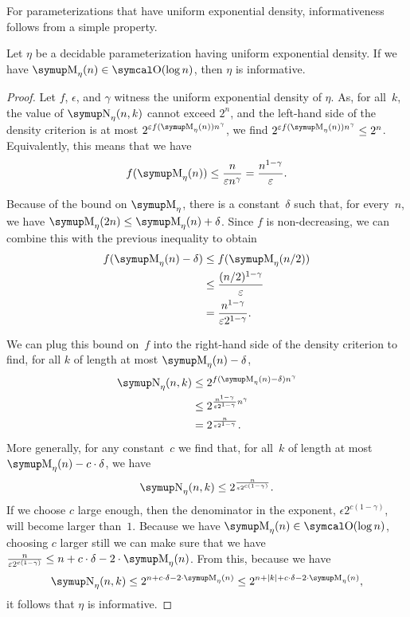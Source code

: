 For parameterizations that have uniform exponential density, informativeness follows from a simple property.
\begin{lemma}
\label{lem:exponentialinformative}%
  Let $\eta$ be a decidable parameterization having uniform exponential density.
  If we have $\upM_\eta(n) \in \bigO(\log n)$, then $\eta$ is informative.
\end{lemma}
\begin{proof}
  Let $f$, $\epsilon$, and $\gamma$ witness the uniform exponential density of $\eta$.
  As, for all~$k$, the value of $\upN_\eta(n, k)$ cannot exceed $2^n$, and the left-hand side of the density criterion is at most $2^{\epsilon f(\upM_\eta(n)) n^\gamma}$, we find $2^{\epsilon f(\upM_\eta(n)) n^\gamma} \le 2^n$.
  Equivalently, this means that we have
  \begin{equation*}
    f(\upM_\eta(n)) \le \frac{n}{\epsilon n^\gamma} = \frac{n^{1 - \gamma}}{\epsilon}.
  \end{equation*}

  Because of the bound on $\upM_\eta$, there is a constant~$\delta$ such that, for every~$n$, we have $\upM_\eta(2 n) \le \upM_\eta(n) + \delta$.
  Since $f$ is non-decreasing, we can combine this with the previous inequality to obtain
  \begin{align*}
    f(\upM_\eta(n) - \delta) &\le f(\upM_\eta(n / 2)) \\
      &\le \frac{(n / 2)^{1 - \gamma}}{\epsilon} \\
      &= \frac{n^{1 - \gamma}}{\epsilon 2^{1 - \gamma}}.
  \end{align*}

  We can plug this bound on~$f$ into the right-hand side of the density criterion to find, for all $k$ of length at most $\upM_\eta(n) - \delta$,
  \begin{align*}
    \upN_\eta(n, k) &\le 2^{f(\upM_\eta(n) - \delta) n^\gamma} \\
      &\le 2^{\frac{n^{1 - \gamma}}{\epsilon 2^{1 - \gamma}} n^\gamma} \\
      &= 2^{\frac{n}{\epsilon 2^{1 - \gamma}}}.
  \end{align*}
  More generally, for any constant~$c$ we find that, for all~$k$ of length at most $\upM_\eta(n) - c \cdot \delta$, we have
  \begin{equation*}
    \upN_\eta(n, k) \le 2^{\frac{n}{\epsilon 2^{c(1 - \gamma)}}}.
  \end{equation*}
  If we choose $c$ large enough, then the denominator in the exponent, $\epsilon 2^{c(1 - \gamma)}$, will become larger than~$1$.
  Because we have $\upM_\eta(n) \in \bigO(\log n)$, choosing $c$ larger still we can make sure that we have $\frac{n}{\epsilon 2^{c(1 - \gamma)}} \le n + c \cdot \delta - 2 \cdot \upM_\eta(n)$.
  From this, because we have
  \begin{equation*}
    \upN_\eta(n, k) \le 2^{n + c \cdot \delta - 2 \cdot \upM_\eta(n)} \le 2^{n + \length{k} + c \cdot \delta - 2 \cdot \upM_\eta(n)},
  \end{equation*}
  it follows that $\eta$ is informative.
\end{proof}

